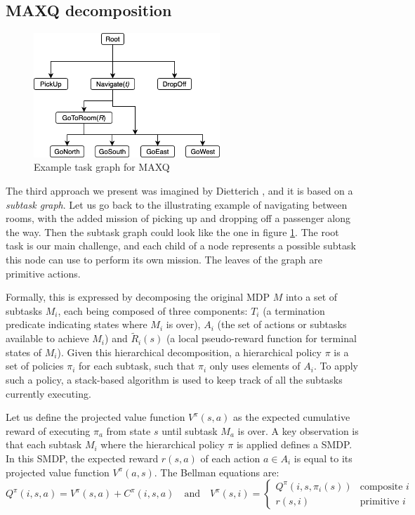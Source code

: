 \documentclass{article}
\begin{document}
\subsection{MAXQ decomposition}

\begin{figure}
\includegraphics[width=7cm]{images/MAXQ.png}
\caption{Example task graph for MAXQ}
\label{fig:MAXQ}
\end{figure}

The third approach we present was imagined by Dietterich \cite{dietterich_hierarchical_2000}, and it is based on a \textit{subtask graph}. Let us go back to the illustrating example of navigating between rooms, with the added mission of picking up and dropping off a passenger along the way. Then the subtask graph could look like the one in figure \ref{fig:MAXQ}. The root task is our main challenge, and each child of a node represents a possible subtask this node can use to perform its own mission. The leaves of the graph are primitive actions.

Formally, this is expressed by decomposing the original MDP $M$ into a set of subtasks $M_i$, each being composed of three components: $T_i$ (a termination predicate indicating states where $M_i$ is over), 
$A_i$ (the set of actions or subtasks available to achieve $M_i$) and
$\tilde{R}_i(s)$ (a local pseudo-reward function for terminal states of $M_i$). Given this hierarchical decomposition, a hierarchical policy $\pi$ is a set of policies $\pi_i$ for each subtask, such that $\pi_i$ only uses elements of $A_i$. To apply such a policy, a stack-based algorithm is used to keep track of all the subtasks currently executing.

Let us define the projected value function $V^{\pi}(s, a)$ as the expected cumulative reward of executing $\pi_a$ from state $s$ until subtask $M_a$ is over. A key observation is that each subtask $M_i$ where the hierarchical policy $\pi$ is applied defines a SMDP. In this SMDP, the expected reward $r(s, a)$ of each action $a \in A_i$ is equal to its projected value function $V^{\pi}(a, s)$. The Bellman equations are:
\begin{equation}
    Q^{\pi}(i, s, a) = V^{\pi}(s, a) + C^{\pi}(i, s, a) \quad \text{and} \quad V^{\pi}(s, i) = \begin{cases} Q^{\pi}(i, s, \pi_i(s)) & \text{composite $i$} \\ r(s, i) & \text{primitive $i$} \end{cases}
\end{equation}
\end{document}
